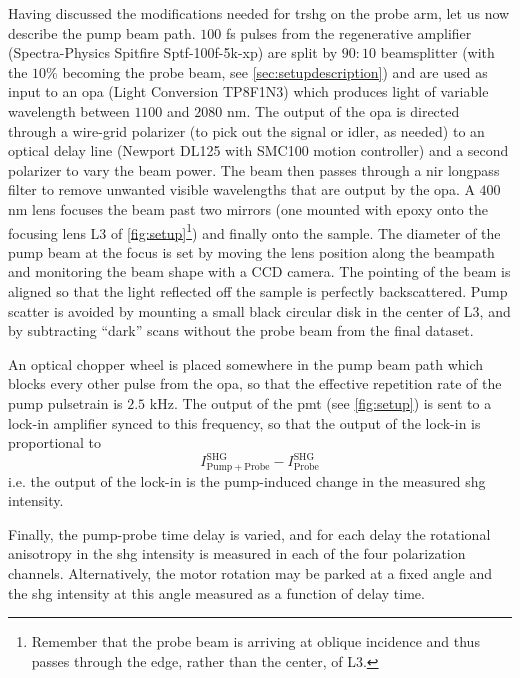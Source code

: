 Having discussed the modifications needed for \gls{trshg} on the probe arm, let us now describe the pump beam path.
$100$ \si{fs} pulses from the regenerative amplifier (Spectra-Physics Spitfire Sptf-100f-5k-xp) are split by $90:10$ beamsplitter (with the $10\%$ becoming the probe beam, see \cref{sec:setupdescription}) and are used as input to an \gls{opa} (Light Conversion TP8F1N3) which produces light of variable wavelength between $1100$ and $2080$ \si{nm}.
The output of the \gls{opa} is directed through a wire-grid polarizer (to pick out the signal or idler, as needed) to an optical delay line (Newport DL125 with SMC100 motion controller) and a second polarizer to vary the beam power.
The beam then passes through a \gls{nir} longpass filter to remove unwanted visible wavelengths that are output by the \gls{opa}.
A $400$ \si{nm} lens focuses the beam past two mirrors (one mounted with epoxy onto the focusing lens L3 of \cref{fig:setup}\footnote{Remember that the probe beam is arriving at oblique incidence and thus passes through the edge, rather than the center, of L3.}) and finally onto the sample.
The diameter of the pump beam at the focus is set by moving the lens position along the beampath and monitoring the beam shape with a CCD camera.
The pointing of the beam is aligned so that the light reflected off the sample is perfectly backscattered.
Pump scatter is avoided by mounting a small black circular disk in the center of L3, and by subtracting ``dark'' scans without the probe beam from the final dataset.

An optical chopper wheel is placed somewhere in the pump beam path which blocks every other pulse from the \gls{opa}, so that the effective repetition rate of the pump pulsetrain is $2.5$ \si{kHz}.
The output of the \gls{pmt} (see \cref{fig:setup}) is sent to a lock-in amplifier synced to this frequency, so that the output of the lock-in is proportional to
\begin{equation}
I^\mathrm{SHG}_{\mathrm{Pump}+\mathrm{Probe}} - I^\mathrm{SHG}_\mathrm{Probe}
\end{equation}
i.e. the output of the lock-in is the pump-induced change in the measured \gls{shg} intensity.

Finally, the pump-probe time delay is varied, and for each delay the rotational anisotropy in the \gls{shg} intensity is measured in each of the four polarization channels.
Alternatively, the motor rotation may be parked at a fixed angle and the \gls{shg} intensity at this angle measured as a function of delay time.

